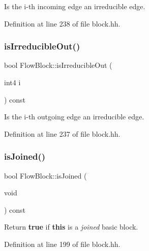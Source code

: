 Is the i-\/th incoming edge an irreducible edge. 



Definition at line 238 of file block.\+hh.

\mbox{\label{class_flow_block_a02d6e487eff4b5460a8b9995e9bf1199}} 
\subsubsection{\texorpdfstring{isIrreducibleOut()}{isIrreducibleOut()}}
{\footnotesize\ttfamily bool Flow\+Block\+::is\+Irreducible\+Out (\begin{DoxyParamCaption}\item[{int4}]{i }\end{DoxyParamCaption}) const\hspace{0.3cm}{\ttfamily [inline]}}



Is the i-\/th outgoing edge an irreducible edge. 



Definition at line 237 of file block.\+hh.

\mbox{\label{class_flow_block_a45bcc5e1fc638ad05984b64d874e8859}} 
\subsubsection{\texorpdfstring{isJoined()}{isJoined()}}
{\footnotesize\ttfamily bool Flow\+Block\+::is\+Joined (\begin{DoxyParamCaption}\item[{void}]{ }\end{DoxyParamCaption}) const\hspace{0.3cm}{\ttfamily [inline]}}



Return {\bfseries{true}} if {\bfseries{this}} is a {\itshape joined} basic block. 



Definition at line 199 of file block.\+hh.

